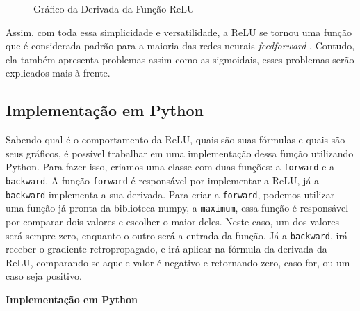 \begin{figure}[h!] %
    \centering %
    \caption{Gráfico da Derivada da Função ReLU}
    \label{fig:relu-derivada}
\end{figure}

Assim, com toda essa simplicidade e versatilidade, a ReLU se tornou uma função que é considerada padrão para a maioria das redes neurais \textit{feedforward} \parencite{DeepLearningBook}. Contudo, ela também apresenta problemas assim como as sigmoidais, esses problemas serão explicados mais à frente.

\subsection{Implementação em Python}

Sabendo qual é o comportamento da ReLU, quais são suas fórmulas e quais são seus gráficos, é possível trabalhar em uma implementação dessa função utilizando Python. Para fazer isso, criamos uma classe com duas funções: a \texttt{forward} e a \texttt{backward}. A função \texttt{forward} é responsável por implementar a ReLU, já a \texttt{backward} implementa a sua derivada. Para criar a \texttt{forward}, podemos utilizar uma função já pronta da biblioteca numpy, a \texttt{maximum}, essa função é responsável por comparar dois valores e escolher o maior deles. Neste caso, um dos valores será sempre zero, enquanto o outro será a entrada da função. Já a \texttt{backward}, irá receber o gradiente retropropagado, e irá aplicar na fórmula da derivada da ReLU, comparando se aquele valor é negativo e retornando zero, caso for, ou um caso seja positivo.

\textbf{Implementação em Python}

